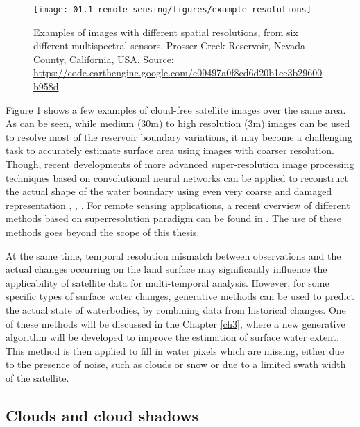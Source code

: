 \begin{figure}
	\texttt{[image: 01.1-remote-sensing/figures/example-resolutions]}
	\caption{Examples of images with different spatial resolutions, from six different multispectral sensors, Prosser Creek Reservoir, Nevada County, California, USA. Source: \url{https://code.earthengine.google.com/e09497a0f8cd6d20b1ce3b29600b958d}}
	\label{fig:example-resolutions}
\end{figure}

Figure \ref{fig:example-resolutions} shows a few examples of cloud-free satellite images over the same area. As can be seen, while medium (30m) to high resolution (3m) images can be used to resolve most of the reservoir boundary variations, it may become a challenging task to accurately estimate surface area using images with coarser resolution. Though, recent developments of more advanced super-resolution image processing techniques based on convolutional neural networks can be applied to reconstruct the actual shape of the water boundary using even very coarse and damaged representation \citep{ledig2016photo}, \citep{shi2016real}, \citep{johnson2016perceptual}. For remote sensing applications, a recent overview of different methods based on superresolution paradigm can be found in \citep{garzelli2016review}. The use of these methods goes beyond the scope of this thesis.

At the same time, temporal resolution mismatch between observations and the actual changes occurring on the land surface may significantly influence the applicability of satellite data for multi-temporal analysis. However, for some specific types of surface water changes, generative methods can be used to predict the actual state of waterbodies, by combining data from historical changes. One of these methods will be discussed in the Chapter \ref{ch3}, where a new generative algorithm will be developed to improve the estimation of surface water extent. This method is then applied to fill in water pixels which are missing, either due to the presence of noise, such as clouds or snow or due to a limited swath width of the satellite.

\subsection{Clouds and cloud shadows}

